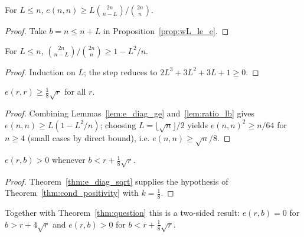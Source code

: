 \begin{lemma}\label{lem:e_diag_ge}
\leanok
{}
For $L\le n$, $e(n,n)\ge L\binom{2n}{n-L}/\binom{2n}{n}$.
\end{lemma}
\begin{proof}\leanok Take $b=n\le n+L$ in Proposition~\ref{prop:wL_le_e}. \end{proof}

\begin{lemma}\label{lem:ratio_lb}
\leanok
For $L\le n$, $\binom{2n}{n-L}/\binom{2n}{n}\ge 1-L^2/n$.
\end{lemma}
\begin{proof}\leanok
Induction on $L$; the step reduces to $2L^3+3L^2+3L+1\ge0$.
\end{proof}

\begin{theorem}\label{thm:e_diag_sqrt}
\leanok
{}
$e(r,r)\ge\tfrac18\sqrt r$ for all $r$.
\end{theorem}
\begin{proof}\leanok
Combining Lemmas~\ref{lem:e_diag_ge} and~\ref{lem:ratio_lb} gives
$e(n,n)\ge L(1-L^2/n)$; choosing $L=\lfloor\sqrt n\rfloor/2$ yields
$e(n,n)^2\ge n/64$ for $n\ge4$ (small cases by direct bound), i.e.
$e(n,n)\ge\sqrt n/8$.
\end{proof}

\begin{theorem}\label{thm:e_pos_below}
\leanok
{}
$e(r,b)>0$ whenever $b<r+\tfrac18\sqrt r$.
\end{theorem}
\begin{proof}\leanok
Theorem~\ref{thm:e_diag_sqrt} supplies the hypothesis of
Theorem~\ref{thm:cond_positivity} with $k=\tfrac18$.
\end{proof}

Together with Theorem~\ref{thm:question} this is a two-sided result: $e(r,b)=0$ for
$b>r+4\sqrt r$ and $e(r,b)>0$ for $b<r+\tfrac18\sqrt r$.
